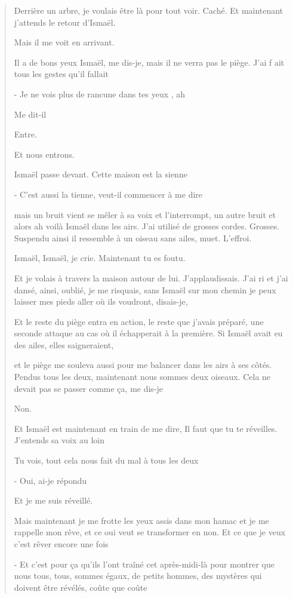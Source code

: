\begin{quote}
Derrière un arbre, je voulais être là pour tout voir. Caché. Et
maintenant j'attends le retour d'Ismaël.

Mais il me voit en arrivant.

Il a de bons yeux Ismaël, me dis-je, mais il ne verra pas le piège. J'ai
f ait tous les gestes qu'il fallait

- Je ne vois plus de rancune dans tes yeux , ah

Me dit-il

Entre.

Et nous entrons.

Ismaël passe devant. Cette maison est la sienne

- C'est aussi la tienne, veut-il commencer à me dire

mais un bruit vient se mêler à sa voix et l'interrompt, un autre bruit
et alors ah voilà Ismaël dans les airs. J'ai utilisé de grosses cordes.
Grosses. Suspendu ainsi il ressemble à un oiseau sans ailes, muet.
L'effroi.

Ismaël, Ismaël, je crie. Maintenant tu es foutu.

Et je volais à travers la maison autour de lui. J'applaudissais. J'ai ri
et j'ai dansé, ainsi, oublié, je me risquais, sans Ismaël sur mon chemin
je peux laisser mes pieds aller où ils voudront, disais-je,

Et le reste du piège entra en action, le reste que j'avais préparé, une
seconde attaque au cas où il échapperait à la première. Si Ismaël avait
eu des ailes, elles saigneraient,

et le piège me souleva aussi pour me balancer dans les airs à ses côtés.
Pendus tous les deux, maintenant nous sommes deux oiseaux. Cela ne
devait pas se passer comme ça, me dis-je

Non.

Et Ismaël est maintenant en train de me dire, Il faut que tu te
réveilles. J'entends sa voix au loin

Tu vois, tout cela nous fait du mal à tous les deux

- Oui, ai-je répondu

Et je me suis réveillé.

Mais maintenant je me frotte les yeux assis dans mon hamac et je me
rappelle mon rêve, et ce oui veut se transformer en non. Et ce que je
veux c'est rêver encore une fois

- Et c'est pour ça qu'ils l'ont traîné cet après-midi-là pour montrer
que nous tous, tous, sommes égaux, de petits hommes, des mystères qui
doivent être révélés, coûte que coûte


\end{quote}
